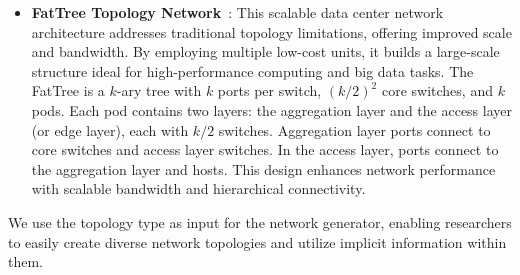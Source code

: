 \begin{itemize}

    \item \textbf{FatTree Topology Network}~\cite{al2008scalable}: This scalable data center network architecture addresses traditional topology limitations, offering improved scale and bandwidth. By employing multiple low-cost units, it builds a large-scale structure ideal for high-performance computing and big data tasks. The FatTree is a $k$-ary tree with $k$ ports per switch, $(k/2)^2$ core switches, and $k$ pods. Each pod contains two layers: the aggregation layer and the access layer (or edge layer), each with $k/2$ switches. Aggregation layer ports connect to core switches and access layer switches. In the access layer, ports connect to the aggregation layer and hosts. This design enhances network performance with scalable bandwidth and hierarchical connectivity.

\end{itemize}

We use the topology type as input for the network generator, enabling researchers to easily create diverse network topologies and utilize implicit information within them.

